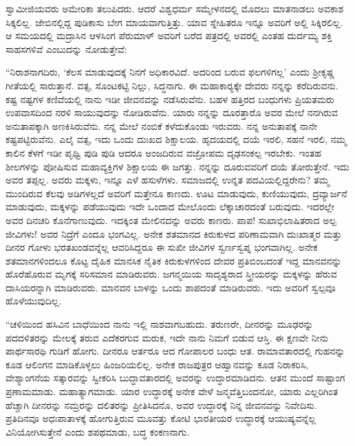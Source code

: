  ಸ್ವಾಮೀಜಿಯವರು ಅಮೇರಿಕಾ ತಲುಪಿದರು. ಆದರೆ ವಿಶ್ವಧರ್ಮ ಸಮ್ಮೇಳನದಲ್ಲಿ ಮೊದಲು ಮಾತನಾಡಲು ಅವಕಾಶ ಸಿಕ್ಕಲಿಲ್ಲ. ಜೇಬಿನಲ್ಲಿದ್ದ ಪುಡಿಕಾಸು ಬೇಗ ಮಾಯವಾಗುತ್ತಿತ್ತು. ಯಾವ ಸ್ನೇಹಿತರೂ ಇನ್ನೂ ಅವರಿಗೆ ಅಲ್ಲಿ ಸಿಕ್ಕಿರಲಿಲ್ಲ. ಆ ಸಮಯದಲ್ಲಿ ಮದ್ರಾಸಿನ ಆಳಸಿಂಗ ಪೆರುಮಾಳ್ ಅವರಿಗೆ ಬರೆದ ಪತ್ರದಲ್ಲಿ ಅವರಲ್ಲಿ ಎಂತಹ ದುರ್ದಮ್ಯ ಶಕ್ತಿ ಸಾಹಸಗಳಿವೆ ಎಂಬುದನ್ನು ನೋಡುತ್ತೇವೆ: 

 “ನಿರಾಶನಾಗದಿರು, ‘ಕೆಲಸ ಮಾಡುವುದಕ್ಕೆ ನಿನಗೆ ಅಧಿಕಾರವಿದೆ. ಅದರಿಂದ ಬರುವ ಫಲಗಳಿಗಲ್ಲ’ ಎಂದು ಶ‍್ರೀಕೃಷ್ಣ ಗೀತೆಯಲ್ಲಿ ಸಾರುತ್ತಾನೆ. ವತ್ಸ, ಸೊಂಟಕಟ್ಟಿ ನಿಲ್ಲು, ಸಿದ್ಧನಾಗು. ಈ ಮಹಾಕಾರ‍್ಯಕ್ಕೇ ದೇವರು ನನ್ನನ್ನು ಕರೆದಿರುವನು. ಕಷ್ಟ ನಷ್ಟಗಳ ಕಣಿವೆಯಲ್ಲಿ ನಾನು ಇಡೀ ಜೀವನವನ್ನು ನಡೆಸಿರುವೆನು. ಬಹಳ ಹತ್ತಿರದ ಬಂಧುಗಳು ಪ್ರಿಯತಮರು ಉಪವಾಸದಿಂದ ನರಳಿ ಸಾಯುವುದನ್ನು ನೋಡಿರುವೆನು. ಯಾರು ನನ್ನನ್ನು ದೂರತ್ತಾರೊ ಅವರ ಮೇಲೆ ನನಗಿರುವ ಅನುತಾಪಕ್ಕಾಗಿ ಅಣಕಿಸಿರುವೆನು. ನನ್ನ ಮೇಲೆ ನಂಬಿಕೆ ಕಳೆದುಕೊಂಡು ಇರುವರು. ನನ್ನ ಅನುತಾಪಕ್ಕೆ ನಾನೇ ಕಷ್ಟಪಟ್ಟಿರುವೆನು. ಎಲೈ ವತ್ಸ, ಇದು ಒಂದು ದುಃಖದ ಶಿಕ್ಷಾಲಯ. ಹೃದಯದಲ್ಲಿ ದಯೆ ಇರಲಿ, ಸಹನೆ ಇರಲಿ, ನಮ್ಮ ಕಾಲಿನ ಕೆಳಗೆ ಇಡೀ ಪೃಥ್ವಿ ಪುಡಿ ಪುಡಿ ಆದರೂ ಅಂಜದಿರುವ ವಜ್ರೋಪಮ ದೃಢಸಂಕಲ್ಪ ಇರಬೇಕು. ಇಂತಹ ಶೀಲಗಳನ್ನು ಪೋಷಿಸುವ ಮಹಾವ್ಯಕ್ತಿಗಳ ಶಿಕ್ಷಾಲಯ ಈ ಜಗತ್ತು. ನನ್ನನ್ನು ದೂರುವವರಿಗೆ ದಯೆ ತೋರುತ್ತೇನೆ. ಇದು ಅವರ ತಪ್ಪಲ್ಲ. ಅವರು ಮಕ್ಕಳು, ಇನ್ನೂ ಎಳೆ ಹಸುಳೆಗಳು. ಸಮಾಜದಲ್ಲಿ ಉನ್ನತ ಪದವಿಯಲ್ಲಿದ್ದರೇನು? ತಮ್ಮ ಮುಂದಿರುವ ಕೆಲವು ಅಡಿಗಳಲ್ಲದೆ ಅವರಿಗೆ ಮತ್ತೇನೂ ಕಾಣದು. ಊಟ ಮಾಡುವುದು, ಕುಣಿಯುವುದು, ದ್ರವ್ಯಾರ್ಜನೆ ಮಾಡುವುದು, ಮಕ್ಕಳನ್ನು ಪಡೆಯುವುದು ಇದೇ ಒಂದಾದ ಮೇಲೊಂದು ಲೆಕ್ಕಾಚಾರದಂತೆ ಬರುವುದು. ಇದರಲ್ಲೇ ಅವರ ದಿನಚರಿ ಕೊನೆಗಾಣುವುದು. ಇದಕ್ಕಿಂತ ಮೇಲಿನದನ್ನು ಅವರು ಕಾಣರು. ಪಾಪ! ಸುಖಾಭಿಲಾಷಿತರಾದ ಅಲ್ಪ ಜೀವಿಗಳು! ಅವರ ನಿದ್ರೆಗೆ ಎಂದೂ ಭಂಗವಿಲ್ಲ. ಅನೇಕ ಶತಮಾನದ ಕಿರುಕುಳದ ಪರಿಣಾಮವಾಗಿ ದುಃಖಾತ್ಮರ ಮತ್ತು ದೀನರ ಗೋಳು ಭರತಖಂಡವನ್ನೆಲ್ಲ ಆವರಿಸಿದ್ದರೂ ಈ ಸುಖೀ ಜೀವಿಗಳ ಸ್ವರ್ಣಸ್ವಪ್ನ ಭಂಗವಾಗಿಲ್ಲ. ಅನೇಕ ಶತಮಾನಗಳಿಂದಲೂ ಕೊಟ್ಟ ದೈಹಿಕ ಮಾನಸಿಕ ನೈತಿಕ ಕಿರುಕುಳಗಳಿಂದ ದೇವರ ಪ್ರತಿಬಿಂಬದಂತೆ ಇದ್ದ ಮಾನವನನ್ನು ಹೊರೆಹೊರುವ ಮೃಗಕ್ಕೆ ಸರಿಸಮಾನ ಮಾಡಿರುವರು. ಜಗನ್ಮಯಿಯ ಸಾದೃಶ್ಯರಾದ ಸ್ತ್ರೀಯರನ್ನು ಮಕ್ಕಳನ್ನು ಹೆರುವ ದಾಸಿಯರನ್ನಾಗಿ ಮಾಡಿರುವರು. ಮಾನವನ ಬಾಳನ್ನು ಒಂದು ಶಾಪದಂತೆ ಮಾಡಿರುವರು. ಇದು ಅವರಿಗೆ ಸ್ವಲ್ಪವೂ ಹೊಳೆಯುವುದಿಲ್ಲ. 

 “ಚಳಿಯಿಂದ ಹಸಿವಿನ ಬಾಧೆಯಿಂದ ನಾನು ಇಲ್ಲಿ ನಾಶವಾಗಬಹುದು. ತರುಣರೇ, ದೀನರನ್ನು ಮೂಢರನ್ನು ಪದದಳಿತರನ್ನು ಮೇಲಕ್ಕೆ ತರುವ ಎದೆಕರಗುವ ಮರುಕ, ಇದೇ ನಾನು ನಿಮಗೆ ಬಿಡುವ ಆಸ್ತಿ. ಈ ಕ್ಷಣವೇ ನೀನು ಪಾರ್ಥಸಾರಥಿ ಗುಡಿಗೆ ಹೋಗು. ದೀನರೂ ಆರ್ತರೂ ಆದ ಗೋಪಾಲರ ಬಂಧು ಆತ. ರಾಮಾವತಾರದಲ್ಲಿ ಗುಹನನ್ನು ಕೂಡ ಆಲಿಂಗನ ಮಾಡಿಕೊಳ್ಳಲು ಹಿಂಜರಿಯಲಿಲ್ಲ. ಅನೇಕ ರಾಜಪುತ್ರರ ಆಹ್ವಾನವನ್ನು ಕೂಡ ನಿರಾಕರಿಸಿ, ವೇಶ್ಯಾಂಗನೆಯ ಸತ್ಕಾರವನ್ನು ಸ್ವೀಕರಿಸಿ ಬುದ್ಧಾವತಾರದಲ್ಲಿ ಅವರನ್ನು ಉದ್ಧಾರಮಾಡಿದನು. ಆತನ ಮುಂದೆ ಸಾಷ್ಟಾಂಗ ಪ್ರಣಾಮಮಾಡು. ಮಹಾತ್ಯಾಗಮಾಡು. ಯಾರ ಉದ್ಧಾರಕ್ಕೆ ಅನೇಕ ವೇಳೆ ಜನ್ಮವೆತ್ತಿಬಂದನೋ, ಯಾರು ಎಲ್ಲರಿಗಿಂತ ಹೆಚ್ಚಾಗಿ ದೀನರನ್ನು ನಮ್ರರನ್ನು ದಲಿತರನ್ನು ಪ್ರೀತಿಸಿದನೊ, ಅವರ ಉದ್ಧಾರಕ್ಕೆ ನಿನ್ನ ಜೀವನವನ್ನು ನಿವೇದಿಸು. ಪ್ರತಿದಿನವೂ ಅಧಃಪಾತಾಳಕ್ಕೆ ಹೋಗುತ್ತಿರುವ ಮೂವತ್ತು ಕೋಟಿ ಭಾರತೀಯರ ಉದ್ಧಾರಕ್ಕೆ ಆಯುಷ್ಯವನ್ನೆಲ್ಲ ವಿನಿಯೋಗಿಸುತ್ತೇನೆ ಎಂದು ಶಪಥಮಾಡು, ಬದ್ಧ ಕಂಕಣನಾಗು.

